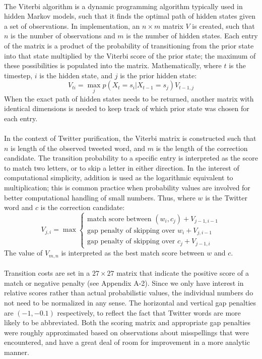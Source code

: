 \documentclass[twocolumn,10pt]{article}
\begin{document}
\paragraph{} The Viterbi algorithm is a dynamic programming algorithm typically used in hidden Markov models, such that it finds the optimal path of hidden states given a set of observations. In implementation, an $n\times m$ matrix $V$ is created, such that $n$ is the number of observations and $m$ is the number of hidden states. Each entry of the matrix is a product of the probability of transitioning from the prior state into that state multiplied by the Viterbi score of the prior state; the maximum of these possibilities is populated into the matrix. Mathematically, where $t$ is the timestep, $i$ is the hidden state, and $j$ is the prior hidden state:
$$V_{ti} = \max\limits_j p(X_t = s_i | X_{t-1} = s_j) V_{t-1,j}$$
When the exact path of hidden states needs to be returned, another matrix with identical dimensions is needed to keep track of which prior state was chosen for each entry.
\paragraph{}In the context of Twitter purification, the Viterbi matrix is constructed such that $n$ is length of the observed tweeted word, and $m$ is the length of the correction candidate. The transition probability to a specific entry is interpreted as the score to match two letters, or to skip a letter in either direction. In the interest of computational simplicity, addition is used as the logarithmic equivalent to multiplication; this is common practice when probability values are involved for better computational handling of small numbers. Thus, where $w$ is the Twitter word and $c$ is the correction candidate:
$$V_{j,i} = \max\begin{cases}
\text{match score between $(w_i,c_j)$} + V_{j-1, i-1}\\
\text{gap penalty of skipping over $w_i$} + V_{j, i-1}\\
\text{gap penalty of skipping over $c_j$} + V_{j-1, i}
\end{cases}$$
The value of $V_{m,n}$ is interpreted as the best match score between $w$ and $c$.
\paragraph{} Transition costs are set in a $27 \times 27$ matrix that indicate the positive score of a match or negative penalty (see Appendix A-2). Since we only have interest in relative scores rather than actual probabilistic values, the individual numbers do not need to be normalized in any sense. The horizontal and vertical gap penalties are $(-1, -0.1)$ respectively, to reflect the fact that Twitter words are more likely to be abbreviated. Both the scoring matrix and appropriate gap penalties were roughly approximated based on observations about misspellings that were encountered, and have a great deal of room for improvement in a more analytic manner.
\end{document}

